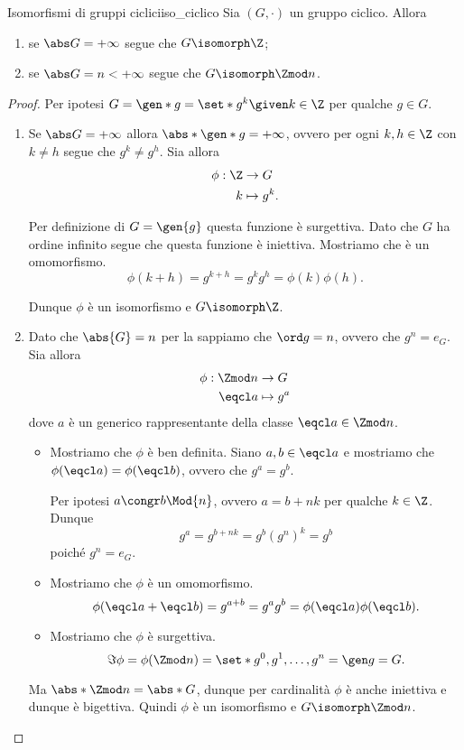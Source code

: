 \begin{theorem}
    {Isomorfismi di gruppi ciclici}{iso_ciclico}
    Sia $(G, \cdot)$ un gruppo ciclico. Allora \begin{enumerate}[label={(\roman*)}]
        \item se $\abs G = +\infty$ segue che $G \isomorph \Z$;
        \item se $\abs G = n < +\infty$ segue che $G \isomorph \Zmod n$.
    \end{enumerate}
\end{theorem}
\begin{proof}
    Per ipotesi $G = \gen*{g} = \set*{g^k \given k \in \Z}$ per qualche $g \in G$.
    \begin{enumerate}[label={(\roman*)}]
        \item Se $\abs G = +\infty$ allora $\abs*{\gen*{g}} = +\infty$, ovvero per ogni $k, h \in \Z$ con $k \neq h$ segue che $g^k \neq g^h$. Sia allora \begin{align*}
            \phi : \Z &\to G\\
            k &\mapsto g^k.
        \end{align*}

        Per definizione di $G = \gen{g}$ questa funzione è surgettiva. Dato che $G$ ha ordine infinito segue che questa funzione è iniettiva. Mostriamo che è un omomorfismo. \[
            \phi(k + h) = g^{k + h} = g^kg^h = \phi(k)\phi(h).    
        \]

        Dunque $\phi$ è un isomorfismo e $G \isomorph \Z$.
        \item Dato che $\abs{G} = n$ per la  sappiamo che $\ord g = n$, ovvero che $g^n = e_G$. Sia allora \begin{align*}
            \phi : \Zmod n &\to G\\
            \eqcl a &\mapsto g^a
        \end{align*} dove $a$ è un generico rappresentante della classe $\eqcl a \in \Zmod n$. \begin{itemize}
            \item Mostriamo che $\phi$ è ben definita. Siano $a, b \in \eqcl a$ e mostriamo che $\phi(\eqcl a) = \phi(\eqcl b)$, ovvero che $g^a = g^b$. 
            
            Per ipotesi $a \congr b \Mod{n}$, ovvero $a = b+nk$ per qualche $k \in \Z$. Dunque \[
                g^a = g^{b + nk} = g^b(g^n)^k = g^b    
            \] poiché $g^n = e_G$.
            \item Mostriamo che $\phi$ è un omomorfismo. \[
                \phi(\eqcl a + \eqcl b) = g^{a + b} = g^ag^b = \phi(\eqcl a)\phi(\eqcl b).
            \] \item Mostriamo che $\phi$ è surgettiva. \[
                \Im \phi = \phi(\Zmod n) = \set*{g^0, g^1, \dots, g^n} = \gen g = G.    
            \]
        \end{itemize}
        Ma $\abs*{\Zmod n} = \abs*{G}$, dunque per cardinalità $\phi$ è anche iniettiva e dunque è bigettiva. 
        Quindi $\phi$ è un isomorfismo e $G \isomorph \Zmod n$.
    \end{enumerate}
\end{proof}

